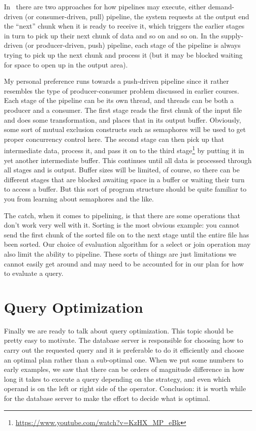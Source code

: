 In~\cite{dsc} there are two approaches for how pipelines may execute, either demand-driven (or consumer-driven, pull) pipeline, the system requests at the output end the ``next'' chunk when it is ready to receive it, which triggers the earlier stages in turn to pick up their next chunk of data and so on and so on. In the supply-driven (or producer-driven, push) pipeline, each stage of the pipeline is always trying to pick up the next chunk and process it (but it may be blocked waiting for space to open up in the output area). 

My personal preference runs towards a push-driven pipeline since it rather resembles the type of producer-consumer problem discussed in earlier courses. Each stage of the pipeline can be its own thread, and threads can be both a producer and a consumer. The first stage reads the first chunk of the input file and does some transformation, and places that in its output buffer. Obviously, some sort of mutual exclusion constructs such as semaphores will be used to get proper concurrency control here. The second stage can then pick up that intermediate data, process it, and pass it on to the third stage\footnote{\url{https://www.youtube.com/watch?v=KzHX_MP_eBk}} by putting it in yet another intermediate buffer. This continues until all data is processed through all stages and is output. Buffer sizes will be limited, of course, so there can be different stages that are blocked awaiting space in a buffer or waiting their turn to access a buffer. But this sort of program structure should be quite familiar to you from learning about semaphores and the like.

The catch, when it comes to pipelining, is that there are some operations that don't work very well with it. Sorting is the most obvious example: you cannot send the first chunk of the sorted file on to the next stage until the entire file has been sorted. Our choice of evaluation algorithm for a select or join operation may also limit the ability to pipeline. These sorts of things are just limitations we cannot easily get around and may need to be accounted for in our plan for how to evaluate a query.

\section*{Query Optimization}

Finally we are ready to talk about query optimization. This topic should be pretty easy to motivate. The database server is responsible for choosing how to carry out the requested query and it is preferable to do it efficiently and choose an optimal plan rather than a sub-optimal one. When we put some numbers to early examples, we saw that there can be orders of magnitude difference in how long it takes to execute a query depending on the strategy, and even which operand is on the left or right side of the operator. Conclusion: it is worth while for the database server to make the effort to decide what is optimal.

